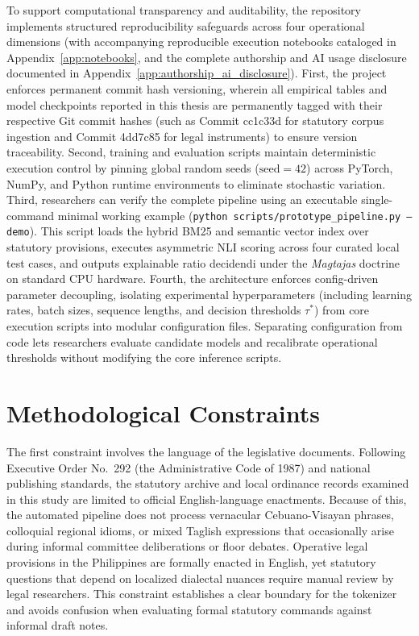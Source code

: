     To support computational transparency and auditability, the repository implements structured reproducibility safeguards across four operational dimensions (with accompanying reproducible execution notebooks cataloged in Appendix~\ref{app:notebooks}, and the complete authorship and AI usage disclosure documented in Appendix~\ref{app:authorship_ai_disclosure}). First, the project enforces permanent commit hash versioning, wherein all empirical tables and model checkpoints reported in this thesis are permanently tagged with their respective Git commit hashes (such as Commit cc1c33d for statutory corpus ingestion and Commit 4dd7c85 for legal instruments) to ensure version traceability. Second, training and evaluation scripts maintain deterministic execution control by pinning global random seeds ($\text{seed} = 42$) across PyTorch, NumPy, and Python runtime environments to eliminate stochastic variation. Third, researchers can verify the complete pipeline using an executable single-command minimal working example (\texttt{python scripts/prototype\_pipeline.py --demo}). This script loads the hybrid BM25 and semantic vector index over statutory provisions, executes asymmetric NLI scoring across four curated local test cases, and outputs explainable ratio decidendi under the \textit{Magtajas} doctrine on standard CPU hardware. Fourth, the architecture enforces config-driven parameter decoupling, isolating experimental hyperparameters (including learning rates, batch sizes, sequence lengths, and decision thresholds $\tau^*$) from core execution scripts into modular configuration files. Separating configuration from code lets researchers evaluate candidate models and recalibrate operational thresholds without modifying the core inference scripts.

    \section{Methodological Constraints}
    \label{sec:methodological_constraints}
    The first constraint involves the language of the legislative documents. Following Executive Order No.~292 (the Administrative Code of 1987) and national publishing standards, the statutory archive and local ordinance records examined in this study are limited to official English-language enactments. Because of this, the automated pipeline does not process vernacular Cebuano-Visayan phrases, colloquial regional idioms, or mixed Taglish expressions that occasionally arise during informal committee deliberations or floor debates. Operative legal provisions in the Philippines are formally enacted in English, yet statutory questions that depend on localized dialectal nuances require manual review by legal researchers. This constraint establishes a clear boundary for the tokenizer and avoids confusion when evaluating formal statutory commands against informal draft notes.

